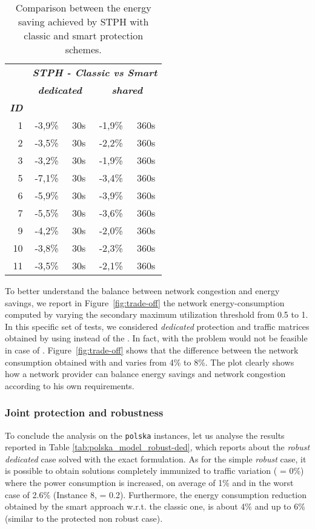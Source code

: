 \documentclass[final,5p,times,twocolumn]{elsarticle}
\begin{document}
\begin{table}[!htbp]
\centering
\scriptsize
\tabcolsep 6pt
\begin{tabular}{rcccc}
& \multicolumn{4}{c}{\textbf{\textit{STPH - Classic vs Smart }}} \\
\cline{2-5}
& \multicolumn{2}{c}{\textbf{\textit{dedicated}}} & \multicolumn{2}{c}{\textbf{\textit{shared}}}  \\ 
\hline
\textbf{\textit{ID}} &  & \textbf{\textit{}} &  & \textbf{\textit{}} \\ 
\hline
1 & -3,9\% & 30s &-1,9\%  &360s\\
2 & -3,5\% & 30s &-2,2\%  &360s\\ 
3 & -3,2\% & 30s &-1,9\%  &360s\\
5 & -7,1\% & 30s &-3,4\%  &360s\\
6 & -5,9\% & 30s &-3,9\%  &360s\\
7 & -5,5\% & 30s &-3,6\%  &360s\\
9 & -4,2\% & 30s &-2,0\%  &360s\\
10& -3,8\% & 30s &-2,3\%  &360s\\
11& -3,5\% & 30s &-2,1\%  &360s\\
\end{tabular}
\caption{Comparison between the energy saving achieved by STPH with classic and smart protection schemes.}
\label{tab:polska_STPH_smart_vs_classic}
\end{table}

To better understand the balance between network congestion and energy savings, we report in Figure~\ref{fig:trade-off} the network energy-consumption computed by varying the secondary maximum utilization threshold  from 0.5 to 1. In this specific set of tests, we considered \textit{dedicated} protection and traffic matrices obtained by using  instead of the . In fact, with  the problem would not be feasible in case of . Figure~\ref{fig:trade-off} shows that the difference between the network consumption obtained with  and  varies from 4\% to 8\%. The plot clearly shows how a network provider can balance energy savings and network congestion according to his own requirements. 

\subsubsection{Joint protection and robustness}
To conclude the analysis on the {\tt polska} instances, let us analyse the results reported in Table \ref{tab:polska_model_robust-ded}, which reports about the \textit{robust dedicated} case solved with the exact formulation. As for the simple \textit{robust} case, it is possible to obtain solutions completely immunized to traffic variation ( = 0\%) where the power consumption is increased, on average of 1\% and in the worst case of 2.6\% (Instance 8,  = 0.2). Furthermore, the  energy consumption reduction obtained by the smart approach w.r.t. the classic one, is about 4\% and up to 6\% (similar to the protected non robust case). 
\end{document}
